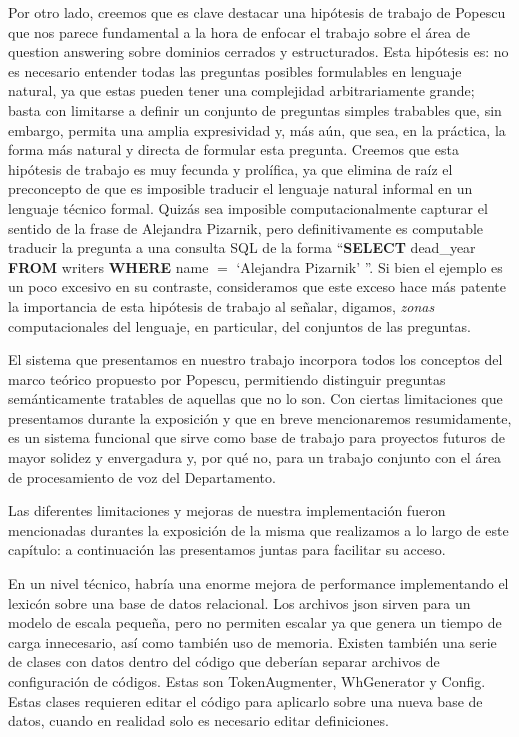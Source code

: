Por otro lado, creemos que es clave destacar una hipótesis de trabajo de Popescu que nos parece fundamental a la hora de enfocar el trabajo sobre el área de question answering sobre dominios cerrados y estructurados. Esta hipótesis es: no es necesario entender todas las preguntas posibles formulables en lenguaje natural, ya que estas pueden tener una complejidad arbitrariamente grande; basta con limitarse a definir un conjunto de preguntas simples trabables que, sin embargo, permita una amplia expresividad y, más aún, que sea, en la práctica, la forma más natural y directa de formular esta pregunta.
Creemos que esta hipótesis de trabajo es muy fecunda y prolífica, ya que elimina de raíz el preconcepto de que es imposible traducir el lenguaje natural informal en un lenguaje técnico formal. Quizás sea imposible computacionalmente capturar el sentido de la frase  de Alejandra Pizarnik, pero definitivamente es computable traducir la pregunta  a una consulta SQL de la forma ``\textbf{SELECT} dead\_year \textbf{FROM} writers \textbf{WHERE} name $=$ `Alejandra Pizarnik' ''. Si bien el ejemplo es un poco excesivo en su contraste, consideramos que este exceso hace más patente la importancia de esta hipótesis de trabajo al señalar, digamos, \textit{zonas} computacionales del lenguaje, en particular, del conjuntos de las preguntas.

El sistema que presentamos en nuestro trabajo incorpora todos los conceptos del marco teórico propuesto por Popescu, permitiendo distinguir preguntas semánticamente tratables de aquellas que no lo son. Con ciertas limitaciones que presentamos durante la exposición y que en breve mencionaremos resumidamente, es un sistema funcional que sirve como base de trabajo para proyectos futuros de mayor solidez y envergadura y, por qué no, para un trabajo conjunto con el área de procesamiento de voz del Departamento.

Las diferentes limitaciones y mejoras de nuestra implementación fueron mencionadas durantes la exposición de la misma que realizamos a lo largo de este capítulo: a continuación las presentamos juntas para facilitar su acceso.

En un nivel técnico, habría una enorme mejora de performance implementando el lexicón sobre una base de datos relacional. Los archivos json sirven para un modelo de escala pequeña, pero no permiten escalar ya que genera un tiempo de carga innecesario, así como también uso de memoria. Existen también una serie de clases con datos dentro del código que deberían separar archivos de configuración de códigos. Estas son TokenAugmenter, WhGenerator y Config. Estas clases requieren editar el código para aplicarlo sobre una nueva base de datos, cuando en realidad solo es necesario editar definiciones.

